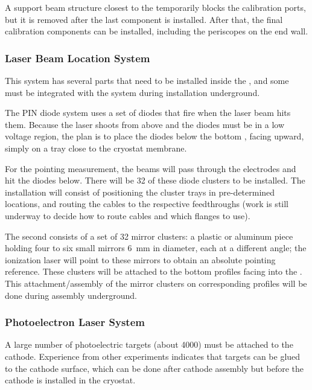 A support beam structure closest to the  temporarily blocks the calibration ports, but it is removed after the last  component is installed. After that, the final calibration components can be installed, including the periscopes on the  end wall. 

\subsubsection{Laser Beam Location System}
This system has several parts that need to be installed inside the , and some must be integrated with the 
 system during installation underground. 

The PIN diode system uses a set of diodes that fire when the laser beam hits them. Because the laser shoots from above and the diodes must be in a low voltage region, the plan is to place the diodes below the bottom , facing upward, simply on a tray close to the cryostat membrane.

For the pointing measurement, the beams will pass through the  electrodes and hit the diodes below. There will be \num{32} of these diode clusters to be installed. The installation will consist of positioning the cluster trays in pre-determined locations, and routing the cables to the respective feedthroughs (work is still underway to decide how to route cables and which flanges to use). 

The second  consists of a set of \num{32} mirror clusters: a plastic or aluminum piece holding four to six small mirrors \SI{6}{\mm} in diameter, each at a different angle; the ionization laser will point to these mirrors to obtain an absolute pointing reference. These clusters will be attached to the bottom  profiles facing into the . 
This attachment/assembly of the mirror clusters on corresponding  profiles will be done during  assembly underground.



\subsubsection{Photoelectron Laser System} 
A large number of photoelectric targets (about \num{4000}) must be %
attached to the cathode. Experience from other experiments indicates that targets can be glued to the cathode surface, which can be done after cathode assembly but before the cathode is installed in the cryostat. 

